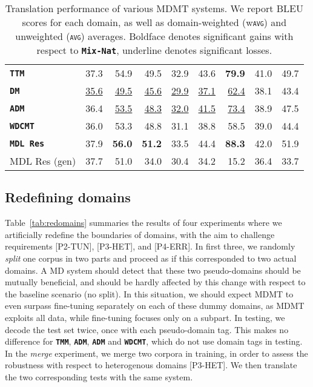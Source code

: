 \documentclass[11pt,a4paper]{article}
\newcommand{\fyTodo}[1]{\Todo[FY:]{\textcolor{orange}{#1}}}
\newcommand{\fyDone}[1]{\done[FY]\Todo[FY:]{\textcolor{orange}{#1}}}
\newcommand{\domain}[1]{\texttt{\textsc{#1}}}
\newcommand{\system}[1]{\texttt{\textbf{#1}}}
\newcommand{\SB}[1]{\textbf{#1}}
\newcommand{\SW}[1]{\underline{#1}}
\begin{document}
\begin{table*}
\begin{tabular}{|p{3cm}|*{8}{r|}}
    \system{TTM}            & 37.3 & 54.9 & 49.5 & 32.9 & 43.6 & \SB{79.9} &41.0 & 49.7     \\%
    \system{DM}             & \SW{35.6} & \SW{49.5}  & \SW{45.6}& \SW{29.9} & \SW{37.1} & \SW{62.4} & 38.1 & 43.4 \\ %
    \system{ADM}           & 36.4 & \SW{53.5}  & \SW{48.3} & \SW{32.0} & \SW{41.5} & \SW{73.4} & 38.9 & 47.5 \\%
    \system{WDCMT}       & 36.0 & 53.3 & 48.8 & 31.1 & 38.8 & 58.5 & 39.0 & 44.4 \\ %
    \system{MDL Res}     & 37.9 & \SB{56.0}  & \SB{51.2}   & 33.5   &  44.4  & \SB{88.3} & 42.0 & 51.9 \\%
    \hfill MDL Res (gen)    & 37.7 & 51.0 & 34.0 & 30.4 & 34.2 & 15.2 & 36.4 & 33.7\\
     \hline
  \end{tabular}
  \caption{Translation performance of various MDMT systems. We report BLEU scores for each domain, as well as domain-weighted (w\domain{avg}) and unweighted (\domain{avg}) averages. Boldface denotes significant gains with respect to \system{Mix-Nat}, underline denotes significant losses.}
  \label{tab:performance}
\end{table*}

\subsection{Redefining domains \label{ssec:redomains}}

Table~\ref{tab:redomains} summaries the results of four experiments where we artificially redefine the boundaries of domains, with the aim to challenge requirements [P2-TUN], [P3-HET], and [P4-ERR]. In first three, we randomly \emph{split} one corpus in two parts and proceed as if this corresponded to two actual domains. A MD system should detect that these two pseudo-domains should be mutually beneficial, and should be hardly affected by this change with respect to the baseline scenario (no split). In this situation, we should expect MDMT to even surpass fine-tuning separately on each of these dummy domains, as MDMT exploits all data, while fine-tuning focuses only on a subpart. In testing, we decode the test set twice, once with each pseudo-domain tag. This makes no difference for \system{TMM}, \system{ADM}, \system{ADM} and \system{WDCMT}, which do not use domain tags in testing.
In the \textsl{merge} experiment, we merge two corpora in training, in order to assess the robustness with respect to heterogenous domains [P3-HET]. We then translate the two corresponding tests with the same system.
\end{document}
